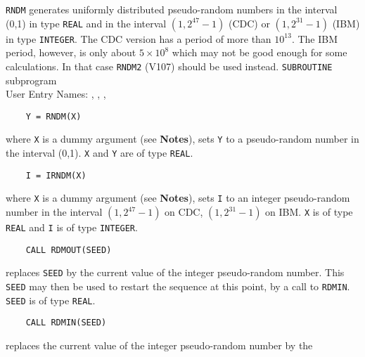                          
  
\Submitter{}                               
                       
\begin{center}
\end{center}
{\tt RNDM} generates uniformly distributed pseudo-random numbers
in the interval (0,1) in type {\tt REAL} and in the interval
$(1,2^{47}-1)$ (CDC) or $(1,2^{31}-1)$ (IBM) in type {\tt INTEGER}.
The CDC version has a period of more than $10^{13}$. The IBM period,
however, is only about $5 \times 10^8 $ which may not be good enough
for some calculations. In that case {\tt RNDM2} (V107) should be used
instead.
\Structure
{\tt SUBROUTINE} subprogram \\
User Entry Names: , , ,
\Usage
\begin{verbatim}
    Y = RNDM(X)
\end{verbatim}
where {\tt X} is a dummy argument (see {\bf Notes}), sets {\tt Y} to a
pseudo-random number in the interval (0,1). {\tt X} and {\tt Y} are of
type {\tt REAL}.
\begin{verbatim}
    I = IRNDM(X)
\end{verbatim}
where {\tt X} is a dummy argument (see {\bf Notes}), sets {\tt I} to an
integer pseudo-random number in the interval $(1,2^{47}-1)$ on CDC,
$(1,2^{31}-1)$ on IBM. {\tt X} is of type {\tt REAL} and {\tt I} is of
type {\tt INTEGER}.
\begin{verbatim}
    CALL RDMOUT(SEED)
\end{verbatim}
replaces {\tt SEED} by the current value of the integer pseudo-random
number. This {\tt SEED} may then be used to restart the sequence at this
point, by a call to {\tt RDMIN}. {\tt SEED} is of type {\tt REAL}.
\begin{verbatim}
    CALL RDMIN(SEED)
\end{verbatim}
replaces the current value of the integer pseudo-random number by the
